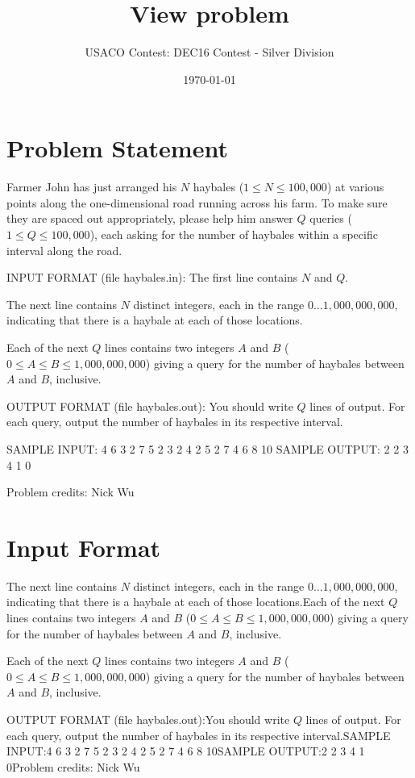 \documentclass[12pt]{article}
\title{View problem}
\author{USACO Contest: DEC16 Contest - Silver Division}
\date{\today}
\begin{document}
\maketitle

\section*{Problem Statement}

Farmer John has just arranged his $N$ haybales ($1 \leq N \leq 100,000$) at
various points along the one-dimensional road running across his farm.  To make
sure they are spaced out appropriately, please help him answer $Q$ queries
($1 \leq Q \leq 100,000$), each asking for the number of haybales within a
specific interval along the road.

INPUT FORMAT (file haybales.in):
The first line contains $N$ and $Q$. 

The next line contains $N$ distinct integers, each in the range
$0 \ldots 1,000,000,000$, indicating that there is a haybale at each of those
locations.

Each of the next $Q$ lines contains two integers $A$ and $B$
($0 \leq A \leq B \leq 1,000,000,000$) giving a query for the number of haybales
between $A$ and $B$, inclusive.

OUTPUT FORMAT (file haybales.out):
You should write $Q$ lines of output.  For each query, output the number of
haybales in its respective interval.

SAMPLE INPUT:
4 6
3 2 7 5
2 3
2 4
2 5
2 7
4 6
8 10
SAMPLE OUTPUT: 
2
2
3
4
1
0


Problem credits: Nick Wu



\section*{Input Format}
The next line contains $N$ distinct integers, each in the range
$0 \ldots 1,000,000,000$, indicating that there is a haybale at each of those
locations.Each of the next $Q$ lines contains two integers $A$ and $B$
($0 \leq A \leq B \leq 1,000,000,000$) giving a query for the number of haybales
between $A$ and $B$, inclusive.

Each of the next $Q$ lines contains two integers $A$ and $B$
($0 \leq A \leq B \leq 1,000,000,000$) giving a query for the number of haybales
between $A$ and $B$, inclusive.

OUTPUT FORMAT (file haybales.out):You should write $Q$ lines of output.  For each query, output the number of
haybales in its respective interval.SAMPLE INPUT:4 6
3 2 7 5
2 3
2 4
2 5
2 7
4 6
8 10SAMPLE OUTPUT:2
2
3
4
1
0Problem credits: Nick Wu
\end{document}
